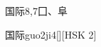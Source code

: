 \begin{entry}{国际}{8,7}{⼞、⾩}
  \begin{phonetics}{国际}{guo2ji4}[][HSK 2]
  \end{phonetics}
\end{entry}
